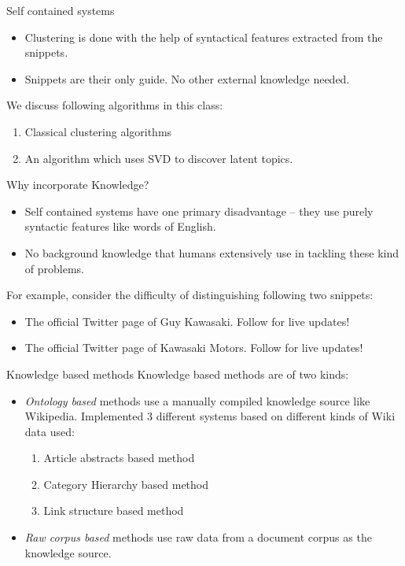 \documentclass{beamer}
\begin{document}
\begin{frame}{Self contained systems}
\begin{itemize}
  \item Clustering is done with the help of syntactical features
    extracted from the snippets.  
  \item Snippets are their only guide. No other external knowledge
    needed.
\end{itemize}
We discuss following algorithms in this class:
\begin{enumerate}
  \item Classical clustering algorithms
  \item An algorithm which uses SVD to discover latent topics.
\end{enumerate}
\end{frame}

\begin{frame}{Why incorporate Knowledge?}
\begin{itemize}
  \item Self contained systems have one primary disadvantage -- they
    use purely syntactic features like words of English. 
  \item No background knowledge that humans extensively use in
    tackling these kind of problems.
\end{itemize}

For example, consider the difficulty of distinguishing following two
snippets:

\begin{itemize}
  \item The official Twitter page of Guy Kawasaki. Follow for
    live updates!
  \item The official Twitter page of Kawasaki Motors. Follow for
    live updates!
\end{itemize}
\end{frame}

\begin{frame}{Knowledge based methods}
Knowledge based methods are of two kinds:
\begin{itemize}
  \item {\it Ontology based} methods use a manually compiled knowledge
    source like Wikipedia. Implemented 3 different systems based on
    different kinds of Wiki data used:

    \begin{enumerate}
      \item Article abstracts based method
      \item Category Hierarchy based method
      \item Link structure based method
    \end{enumerate}

  \item {\it Raw corpus based} methods use raw data from a document
    corpus as the knowledge source. 
\end{itemize}
\end{frame}
\end{document}
